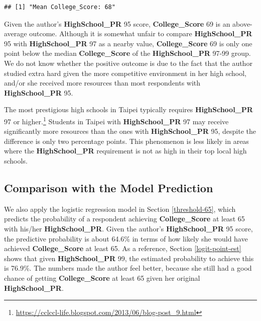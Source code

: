 \documentclass[
]{article}
\begin{document}
\begin{verbatim}
## [1] "Mean College_Score: 68"
\end{verbatim}

Given the author's \textbf{HighSchool\_PR} 95 score,
\textbf{College\_Score} 69 is an above-average outcome. Although it is
somewhat unfair to compare \textbf{HighSchool\_PR} 95 with
\textbf{HighSchool\_PR} 97 as a nearby value, \textbf{College\_Score} 69
is only one point below the median \textbf{College\_Score} of the
\textbf{HighSchool\_PR} 97-99 group. We do not know whether the positive
outcome is due to the fact that the author studied extra hard given the
more competitive environment in her high school, and/or she received
more resources than most respondents with \textbf{HighSchool\_PR} 95.

The most prestigious high schools in Taipei typically requires
\textbf{HighSchool\_PR} 97 or higher.\footnote{\url{https://cclccl-life.blogspot.com/2013/06/blog-post_9.html}}
Students in Taipei with \textbf{HighSchool\_PR} 97 may receive
significantly more resources than the ones with \textbf{HighSchool\_PR}
95, despite the difference is only two percentage points. This
phenomenon is less likely in areas where the \textbf{HighSchool\_PR}
requirement is not as high in their top local high schools.

\hypertarget{comparison-with-the-model-prediction}{%
\subsection{Comparison with the Model
Prediction}\label{comparison-with-the-model-prediction}}

We also apply the logistic regression model in Section
\ref{threshold-65}, which predicts the probability of a respondent
achieving \textbf{College\_Score} at least 65 with his/her
\textbf{HighSchool\_PR}. Given the author's \textbf{HighSchool\_PR} 95
score, the predictive probability is about 64.6\% in terms of how likely
she would have achieved \textbf{College\_Score} at least 65. As a
reference, Section \ref{logit-point-est} shows that given
\textbf{HighSchool\_PR} 99, the estimated probability to achieve this is
76.9\%. The numbers made the author feel better, because she still had a
good chance of getting \textbf{College\_Score} at least 65 given her
original \textbf{HighSchool\_PR}.
\end{document}
